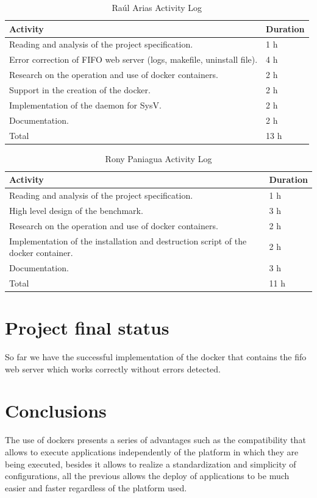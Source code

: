 \documentclass{article}
\begin{document}
\begin{table}[H]
\centering
\caption{Raúl Arias Activity Log}
\begin{tabular}{|p{7cm}|p{7cm}|}
\hline
\textbf{Activity} & \textbf{Duration} \\ \hline
Reading and analysis of the project specification. & 1 h \\ \hline 
Error correction of FIFO web server (logs, makefile, uninstall file). & 4 h  \\ \hline
Research on the operation and use of docker containers. & 2 h \\ \hline
Support in the creation of the docker. & 2 h \\ \hline
Implementation of the daemon for SysV. & 2 h \\ \hline
Documentation. & 2 h\\ \hline
Total & 13 h \\ \hline
\end{tabular}
\end{table}

\begin{table}[H]
\centering
\caption{Rony Paniagua Activity Log}
\begin{tabular}{|p{7cm}|p{7cm}|}
\hline
\textbf{Activity} & \textbf{Duration} \\ \hline
Reading and analysis of the project specification. & 1 h \\ \hline
High level design of the benchmark. & 3 h\\ \hline
Research on the operation and use of docker containers. & 2 h\\ \hline
Implementation of the installation and destruction script of the docker container. & 2 h\\ \hline
Documentation. & 3 h\\ \hline
Total & 11 h\\ \hline
\end{tabular}
\end{table}

\section{Project final status}
So far we have the successful implementation of the docker that contains the fifo web server which works correctly without errors detected.
\section{Conclusions}
The use of dockers presents a series of advantages such as the compatibility that allows to execute applications independently of the platform in which they are being executed, besides it allows to realize a standardization and simplicity of configurations, all the previous allows the deploy of applications to be much easier and faster regardless of the platform used.
\end{document}
